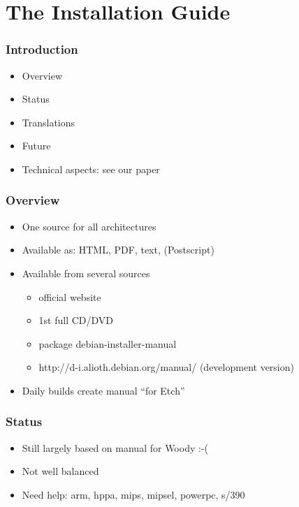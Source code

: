 \documentclass{beamer}
\begin{document}

\section{The Installation Guide}

\begin{frame}
  \frametitle{Introduction}
	\begin{itemize}
	\item
		Overview
	\item
		Status
	\item
		Translations
	\item
		Future
	\item
		Technical aspects: see our paper
	\end{itemize}
\end{frame}

\begin{frame}
  \frametitle{Overview}
	\begin{itemize}
	\item
		One source for all architectures
	\item
		Available as: HTML, PDF, text, (Postscript)
	\item
		Available from several sources
		\begin{itemize}
		\item
			official website
		\item
			1st full CD/DVD
		\item
			package debian-installer-manual
		\item
			http://d-i.alioth.debian.org/manual/ (development version)
		\end{itemize}
	\item
		Daily builds create manual ``for Etch''
	\end{itemize}
\end{frame}

\begin{frame}
  \frametitle{Status}
	\begin{itemize}
	\item
		Still largely based on manual for Woody :-(
	\item
		Not well balanced
	\item
		Need help: arm, hppa, mips, mipsel, powerpc, s/390
	\end{itemize}
\end{frame}
\end{document}
